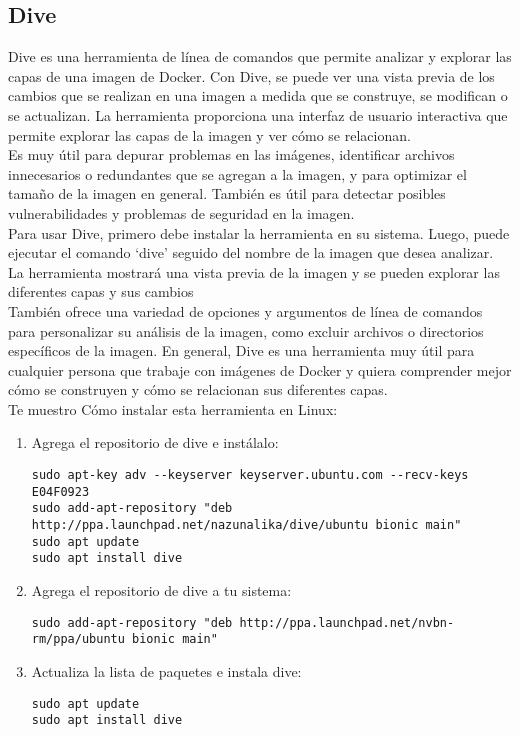 \documentclass{article}
\begin{document}
\subsection{Dive}
Dive es una herramienta de línea de comandos que permite analizar y explorar las capas de una imagen de Docker. Con Dive, se puede ver una vista previa de los cambios que se realizan en una imagen a medida que se construye, se modifican o se actualizan. La herramienta proporciona una interfaz de usuario interactiva que permite explorar las capas de la imagen y ver cómo se relacionan.\\

Es muy útil para depurar problemas en las imágenes, identificar archivos innecesarios o redundantes que se agregan a la imagen, y para optimizar el tamaño de la imagen en general. También es útil para detectar posibles vulnerabilidades y problemas de seguridad en la imagen.\\

Para usar Dive, primero debe instalar la herramienta en su sistema. Luego, puede ejecutar el comando \enquote*{dive} seguido del nombre de la imagen que desea analizar. La herramienta mostrará una vista previa de la imagen y se pueden explorar las diferentes capas y sus cambios\\

También ofrece una variedad de opciones y argumentos de línea de comandos para personalizar su análisis de la imagen, como excluir archivos o directorios específicos de la imagen. En general, Dive es una herramienta muy útil para cualquier persona que trabaje con imágenes de Docker y quiera comprender mejor cómo se construyen y cómo se relacionan sus diferentes capas.\\

Te muestro Cómo instalar esta herramienta en Linux:
\begin{enumerate}
      \item Agrega el repositorio de dive e instálalo:
      \begin{lstlisting}[numbers=none]
sudo apt-key adv --keyserver keyserver.ubuntu.com --recv-keys E04F0923
sudo add-apt-repository "deb http://ppa.launchpad.net/nazunalika/dive/ubuntu bionic main"
sudo apt update
sudo apt install dive \end{lstlisting}
      \item Agrega el repositorio de dive a tu sistema:
            \begin{lstlisting}[numbers=none]
sudo add-apt-repository "deb http://ppa.launchpad.net/nvbn-rm/ppa/ubuntu bionic main"           \end{lstlisting}
      \item Actualiza la lista de paquetes e instala dive:
\begin{lstlisting}[numbers=none]
sudo apt update
sudo apt install dive\end{lstlisting}
\end{enumerate}
\end{document}
